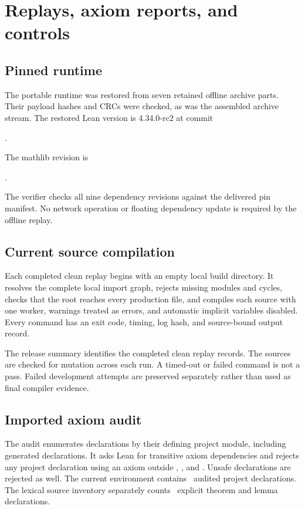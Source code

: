 \documentclass[11pt]{article}
\begin{document}
\section{Replays, axiom reports, and controls}
\subsection{Pinned runtime}
The portable runtime was restored from seven retained offline archive parts. Their payload hashes and CRCs were checked, as was the assembled archive stream. The restored Lean version is 4.34.0-rc2 at commit
\begin{center}\small{}.\end{center}
The mathlib revision is
\begin{center}\small{}.\end{center}
The verifier checks all nine dependency revisions against the delivered pin manifest. No network operation or floating dependency update is required by the offline replay.

\subsection{Current source compilation}
Each completed clean replay begins with an empty local build directory. It resolves the complete local import graph, rejects missing modules and cycles, checks that the root reaches every production file, and compiles each source with one worker, warnings treated as errors, and automatic implicit variables disabled. Every command has an exit code, timing, log hash, and source-bound output record.

The release summary identifies the completed clean replay records. The sources are checked for mutation across each run. A timed-out or failed command is not a pass. Failed development attempts are preserved separately rather than used as final compiler evidence.

\subsection{Imported axiom audit}
The audit enumerates declarations by their defining project module, including generated declarations. It asks Lean for transitive axiom dependencies and rejects any project declaration using an axiom outside , , and . Unsafe declarations are rejected as well. The current environment contains \EditionAuditedDeclarations\ audited project declarations. The lexical source inventory separately counts \EditionFormalTheorems\ explicit theorem and lemma declarations.
\end{document}
